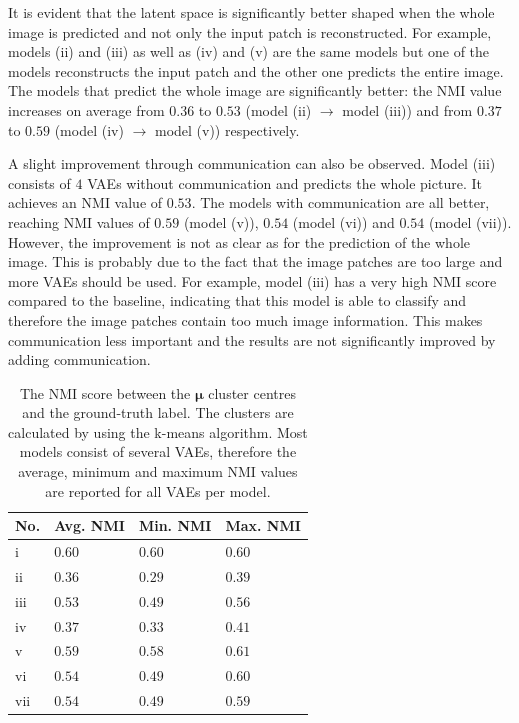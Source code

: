 It is evident that the latent space is significantly better shaped when the whole image is predicted and not only the input patch is reconstructed. For example, models (ii) and (iii) as well as (iv) and (v) are the same models but one of the models reconstructs the input patch and the other one predicts the entire image. The models that predict the whole image are significantly better: the NMI value increases on average from $0.36$ to $0.53$ (model (ii) $\rightarrow$ model (iii)) and from $0.37$ to $0.59$ (model (iv) $\rightarrow$ model (v)) respectively.

A slight improvement through communication can also be observed. Model (iii) consists of $4$ VAEs without communication and predicts the whole picture. It achieves an NMI value of $0.53$. The models with communication are all better, reaching NMI values of $0.59$ (model (v)), $0.54$ (model (vi)) and $0.54$ (model (vii)). However, the improvement is not as clear as for the prediction of the whole image. This is probably due to the fact that the image patches are too large and more VAEs should be used. For example, model (iii) has a very high NMI score compared to the baseline, indicating that this model is able to classify and therefore the image patches contain too much image information. This makes communication less important and the results are not significantly improved by adding communication.


\begin{table}[h] 
    \centering
	 \begin{tabular}{l l l l}
    	\textbf{No.} & \textbf{Avg. NMI} & \textbf{Min. NMI} & \textbf{Max. NMI}\\
        \hline
		i & $0.60$ & $0.60$ & $0.60$ \\
		ii & $0.36$  & $0.29$ & $0.39$ \\
		iii & $0.53$ & $0.49$ & $0.56$ \\
		iv & $0.37$ & $0.33$ & $0.41$\\
		v & $0.59$ & $0.58$ & $0.61$ \\
		vi & $0.54$ & $0.49$ & $0.60$ \\
		vii & $0.54$ & $0.49$ & $0.59$\\
    \end{tabular}
    \caption[NMI score of different architectures]{The NMI score between the $\boldsymbol{\mu}$ cluster centres and the ground-truth label. The clusters are calculated by using the k-means algorithm. Most models consist of several VAEs, therefore the average, minimum and maximum NMI values are reported for all VAEs per model.}
\end{table}

